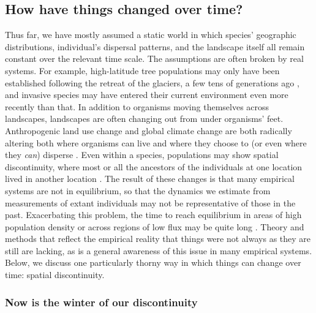 \documentclass{ar-1col}
\newcommand{\todo}[1]{{\textbf{\color{red}{#1}}}}
\begin{document}
\todo{Fst, various IBD-metrics???}


\subsection{How have things changed over time?}

Thus far, we have mostly assumed a static world
in which species' geographic distributions,
individual's dispersal patterns,
and the landscape itself all remain constant over the relevant time scale.
The assumptions are often broken by real systems.
For example, 
high-latitude tree populations may only have been established
following the retreat of the glaciers,
a few tens of generations ago \citep{WhitlockMcCauley1999},
and invasive species may have entered their current
environment even more recently than that.
In addition to organisms moving themselves across landscapes,
landscapes are often changing out from under organisms' feet.
Anthropogenic land use change
and global climate change
are both radically altering both where organisms can live
and where they choose to
(or even where they \textit{can}) disperse \citep{parmesan1999}.
Even within a species,
populations may show spatial discontinuity,
where most or all the ancestors of the individuals at one location
lived in another location 
\citep{bi2013unlocking,skoglund2014investigating,lazaridis_ancient_2014, joseph2018inference}.
The result of these changes is that many empirical systems
are not in equilibrium,
so that the dynamics we estimate from
measurements of extant individuals may
not be representative of those in the past.
Exacerbating this problem,
the time to reach equilibrium
in areas of high population density
or across regions of low flux
may be quite long
\citep{CrowAoki1984group, whitlock1992temporal, slatkin1993isolation, WhitlockMcCauley1999}.
Theory and methods that
reflect the empirical reality that things were not always as they are
still are lacking, 
as is a general awareness of this issue in many empirical systems.
Below, we discuss one particularly thorny way in which 
things can change over time: spatial discontinuity.

\todo{read through and edit}

\subsubsection{Now is the winter of our discontinuity}
\end{document}
